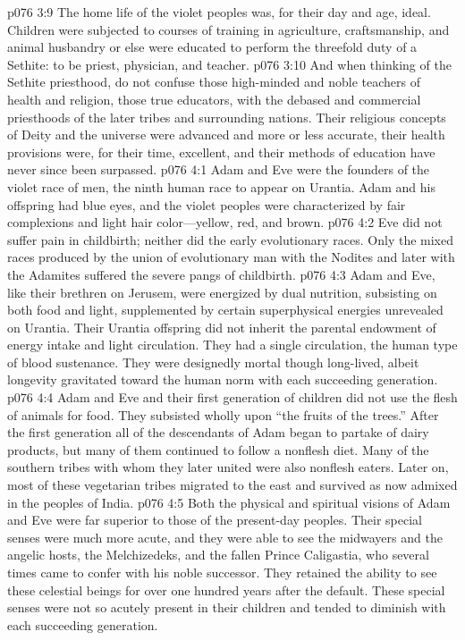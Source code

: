 \vs p076 3:9 The home life of the violet peoples was, for their day and age, ideal. Children were subjected to courses of training in agriculture, craftsmanship, and animal husbandry or else were educated to perform the threefold duty of a Sethite: to be priest, physician, and teacher.
\vs p076 3:10 And when thinking of the Sethite priesthood, do not confuse those high\hyp{}minded and noble teachers of health and religion, those true educators, with the debased and commercial priesthoods of the later tribes and surrounding nations. Their religious concepts of Deity and the universe were advanced and more or less accurate, their health provisions were, for their time, excellent, and their methods of education have never since been surpassed.
\vs p076 4:1 Adam and Eve were the founders of the violet race of men, the ninth human race to appear on Urantia. Adam and his offspring had blue eyes, and the violet peoples were characterized by fair complexions and light hair color---yellow, red, and brown.
\vs p076 4:2 Eve did not suffer pain in childbirth; neither did the early evolutionary races. Only the mixed races produced by the union of evolutionary man with the Nodites and later with the Adamites suffered the severe pangs of childbirth.
\vs p076 4:3 Adam and Eve, like their brethren on Jerusem, were energized by dual nutrition, subsisting on both food and light, supplemented by certain superphysical energies unrevealed on Urantia. Their Urantia offspring did not inherit the parental endowment of energy intake and light circulation. They had a single circulation, the human type of blood sustenance. They were designedly mortal though long\hyp{}lived, albeit longevity gravitated toward the human norm with each succeeding generation.
\vs p076 4:4 Adam and Eve and their first generation of children did not use the flesh of animals for food. They subsisted wholly upon “the fruits of the trees.” After the first generation all of the descendants of Adam began to partake of dairy products, but many of them continued to follow a nonflesh diet. Many of the southern tribes with whom they later united were also nonflesh eaters. Later on, most of these vegetarian tribes migrated to the east and survived as now admixed in the peoples of India.
\vs p076 4:5 Both the physical and spiritual visions of Adam and Eve were far superior to those of the present\hyp{}day peoples. Their special senses were much more acute, and they were able to see the midwayers and the angelic hosts, the Melchizedeks, and the fallen Prince Caligastia, who several times came to confer with his noble successor. They retained the ability to see these celestial beings for over one hundred years after the default. These special senses were not so acutely present in their children and tended to diminish with each succeeding generation.
